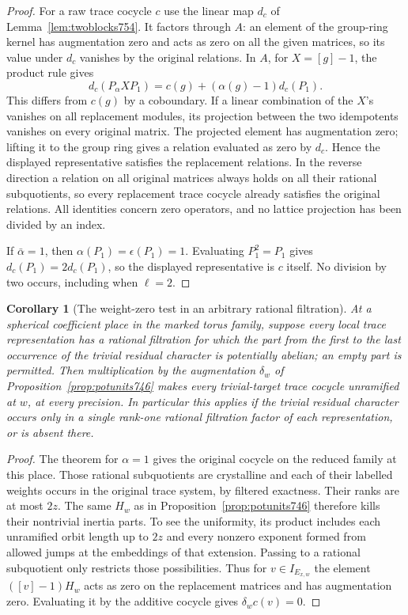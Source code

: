 \documentclass[a4paper,11pt]{article}
\newtheorem{corollary}[proposition]{Corollary}
\theoremstyle{definition}
\theoremstyle{remark}
\numberwithin{equation}{section}
\begin{document}
\begin{proof}
For a raw trace cocycle \(c\) use the linear map \(d_c\) of
Lemma~\ref{lem:twoblocks754}. It factors through \(A\): an
element of the group-ring kernel has augmentation zero and
acts as zero on all the given matrices, so its value under
\(d_c\) vanishes by the original relations. In \(A\), for
\(X=[g]-1\), the product rule gives
\[
 d_c(P_\alpha X P_1)
        = c(g)+(\alpha(g)-1)d_c(P_1).
\]
This differs from \(c(g)\) by a coboundary. If a linear
combination of the \(X\)'s vanishes on all replacement
modules, its projection between the two idempotents vanishes
on every original matrix. The projected element has
augmentation zero; lifting it to the group ring gives a
relation evaluated as zero by \(d_c\). Hence the displayed
representative satisfies the replacement relations. In the
reverse direction a relation on all original matrices always
holds on all their rational subquotients, so every replacement
trace cocycle already satisfies the original relations. All
identities concern zero operators, and no lattice projection
has been divided by an index.

If \(\bar\alpha=1\), then \(\alpha(P_1)=\epsilon(P_1)=1\).
Evaluating \(P_1^2=P_1\) gives \(d_c(P_1)=2d_c(P_1)\), so
the displayed representative is \(c\) itself. No division
by two occurs, including when \(\ell=2\).
\end{proof}

\begin{corollary}[The weight-zero test in an arbitrary rational filtration]
\leavevmode\label{cor:zerointerval755}
At a spherical coefficient place in the marked torus family,
suppose every local trace representation has a rational
filtration for which the part from the first to the last
occurrence of the trivial residual character is potentially
abelian; an empty part is permitted. Then multiplication by
the augmentation \(\delta_w\) of
Proposition~\ref{prop:potunits746} makes every trivial-target
trace cocycle unramified at \(w\), at every precision. In
particular this applies if the trivial residual character
occurs only in a single rank-one rational filtration factor
of each representation, or is absent there.
\end{corollary}
\begin{proof}
The theorem for \(\alpha=1\) gives the original cocycle on the
reduced family at this place. Those rational subquotients are
crystalline and each of their labelled weights occurs in the
original trace system, by filtered exactness. Their ranks are
at most \(2z\). The same \(H_w\) as in
Proposition~\ref{prop:potunits746} therefore kills their
nontrivial inertia parts. To see the uniformity, its product
includes each unramified orbit length up to \(2z\) and every
nonzero exponent formed from allowed jumps at the embeddings
of that extension. Passing to a rational subquotient only
restricts those possibilities. Thus for \(v\in I_{E_{x,w}}\)
the element \(([v]-1)H_w\) acts as zero on the replacement
matrices and has augmentation zero. Evaluating it by the
additive cocycle gives \(\delta_w c(v)=0\).
\end{proof}
\end{document}
